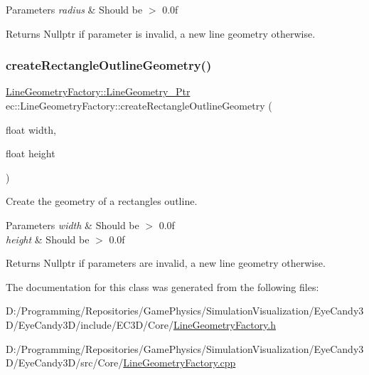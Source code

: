 \begin{DoxyParams}{Parameters}
{\em radius} & Should be $>$ 0.\+0f \\
\hline
\end{DoxyParams}
\begin{DoxyReturn}{Returns}
Nullptr if parameter is invalid, a new line geometry otherwise. 
\end{DoxyReturn}
\mbox{\label{classec_1_1_line_geometry_factory_ad5a4cbba96cb7d6fa979e6266c7a8912}} 
\subsubsection{\texorpdfstring{create\+Rectangle\+Outline\+Geometry()}{createRectangleOutlineGeometry()}}
{\footnotesize\ttfamily \mbox{\hyperlink{classec_1_1_line_geometry_factory_a8f7bd7480ebc0dbc77930d81dcb69678}{Line\+Geometry\+Factory\+::\+Line\+Geometry\+\_\+\+Ptr}} ec\+::\+Line\+Geometry\+Factory\+::create\+Rectangle\+Outline\+Geometry (\begin{DoxyParamCaption}\item[{float}]{width,  }\item[{float}]{height }\end{DoxyParamCaption})\hspace{0.3cm}{\ttfamily [static]}}



Create the geometry of a rectangle\textquotesingle{}s outline. 


\begin{DoxyParams}{Parameters}
{\em width} & Should be $>$ 0.\+0f \\
\hline
{\em height} & Should be $>$ 0.\+0f \\
\hline
\end{DoxyParams}
\begin{DoxyReturn}{Returns}
Nullptr if parameters are invalid, a new line geometry otherwise. 
\end{DoxyReturn}


The documentation for this class was generated from the following files\+:\begin{DoxyCompactItemize}
\item 
D\+:/\+Programming/\+Repositories/\+Game\+Physics/\+Simulation\+Visualization/\+Eye\+Candy3\+D/\+Eye\+Candy3\+D/include/\+E\+C3\+D/\+Core/\mbox{\hyperlink{_line_geometry_factory_8h}{Line\+Geometry\+Factory.\+h}}\item 
D\+:/\+Programming/\+Repositories/\+Game\+Physics/\+Simulation\+Visualization/\+Eye\+Candy3\+D/\+Eye\+Candy3\+D/src/\+Core/\mbox{\hyperlink{_line_geometry_factory_8cpp}{Line\+Geometry\+Factory.\+cpp}}\end{DoxyCompactItemize}
